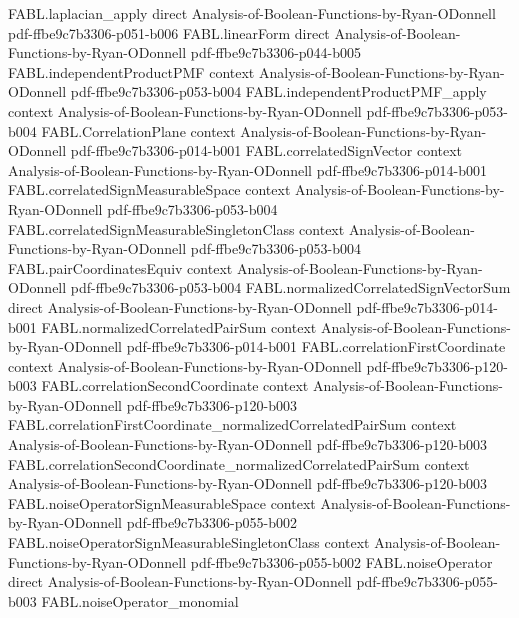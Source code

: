 \begin{theorem}
  {FABL.laplacian_apply}
  {direct}
  {Analysis-of-Boolean-Functions-by-Ryan-ODonnell}
  {pdf-ffbe9c7b3306-p051-b006}
\proofstep
  {FABL.linearForm}
  {direct}
  {Analysis-of-Boolean-Functions-by-Ryan-ODonnell}
  {pdf-ffbe9c7b3306-p044-b005}
\proofstep
  {FABL.independentProductPMF}
  {context}
  {Analysis-of-Boolean-Functions-by-Ryan-ODonnell}
  {pdf-ffbe9c7b3306-p053-b004}
\proofstep
  {FABL.independentProductPMF_apply}
  {context}
  {Analysis-of-Boolean-Functions-by-Ryan-ODonnell}
  {pdf-ffbe9c7b3306-p053-b004}
\proofstep
  {FABL.CorrelationPlane}
  {context}
  {Analysis-of-Boolean-Functions-by-Ryan-ODonnell}
  {pdf-ffbe9c7b3306-p014-b001}
\proofstep
  {FABL.correlatedSignVector}
  {context}
  {Analysis-of-Boolean-Functions-by-Ryan-ODonnell}
  {pdf-ffbe9c7b3306-p014-b001}
\proofstep
  {FABL.correlatedSignMeasurableSpace}
  {context}
  {Analysis-of-Boolean-Functions-by-Ryan-ODonnell}
  {pdf-ffbe9c7b3306-p053-b004}
\proofstep
  {FABL.correlatedSignMeasurableSingletonClass}
  {context}
  {Analysis-of-Boolean-Functions-by-Ryan-ODonnell}
  {pdf-ffbe9c7b3306-p053-b004}
\proofstep
  {FABL.pairCoordinatesEquiv}
  {context}
  {Analysis-of-Boolean-Functions-by-Ryan-ODonnell}
  {pdf-ffbe9c7b3306-p053-b004}
\proofstep
  {FABL.normalizedCorrelatedSignVectorSum}
  {direct}
  {Analysis-of-Boolean-Functions-by-Ryan-ODonnell}
  {pdf-ffbe9c7b3306-p014-b001}
\proofstep
  {FABL.normalizedCorrelatedPairSum}
  {context}
  {Analysis-of-Boolean-Functions-by-Ryan-ODonnell}
  {pdf-ffbe9c7b3306-p014-b001}
\proofstep
  {FABL.correlationFirstCoordinate}
  {context}
  {Analysis-of-Boolean-Functions-by-Ryan-ODonnell}
  {pdf-ffbe9c7b3306-p120-b003}
\proofstep
  {FABL.correlationSecondCoordinate}
  {context}
  {Analysis-of-Boolean-Functions-by-Ryan-ODonnell}
  {pdf-ffbe9c7b3306-p120-b003}
\proofstep
  {FABL.correlationFirstCoordinate_normalizedCorrelatedPairSum}
  {context}
  {Analysis-of-Boolean-Functions-by-Ryan-ODonnell}
  {pdf-ffbe9c7b3306-p120-b003}
\proofstep
  {FABL.correlationSecondCoordinate_normalizedCorrelatedPairSum}
  {context}
  {Analysis-of-Boolean-Functions-by-Ryan-ODonnell}
  {pdf-ffbe9c7b3306-p120-b003}
\proofstep
  {FABL.noiseOperatorSignMeasurableSpace}
  {context}
  {Analysis-of-Boolean-Functions-by-Ryan-ODonnell}
  {pdf-ffbe9c7b3306-p055-b002}
\proofstep
  {FABL.noiseOperatorSignMeasurableSingletonClass}
  {context}
  {Analysis-of-Boolean-Functions-by-Ryan-ODonnell}
  {pdf-ffbe9c7b3306-p055-b002}
\proofstep
  {FABL.noiseOperator}
  {direct}
  {Analysis-of-Boolean-Functions-by-Ryan-ODonnell}
  {pdf-ffbe9c7b3306-p055-b003}
\proofstep
  {FABL.noiseOperator_monomial}

\end{theorem}
